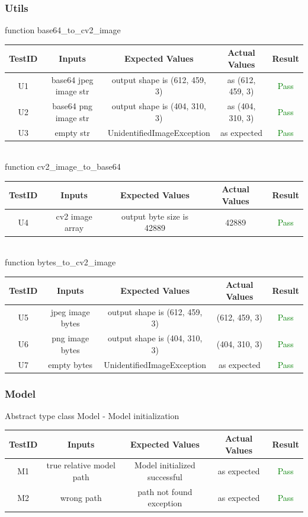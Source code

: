 \documentclass[12pt, oneside, openany, titlepage]{article}
\begin{document}
\subsubsection{Utils}
function base64\_to\_cv2\_image \\
\begin{tabular}{ |c|c|c|c|c| } 
 \hline
 TestID & Inputs & Expected Values & Actual Values & Result \\ 
 \hline
U1 & base64 jpeg image str & output shape is (612, 459, 3) & as (612, 459, 3) & \textcolor{green}{Pass} \\ 
U2 & base64 png image str & output shape is (404, 310, 3) & as (404, 310, 3) & \textcolor{green}{Pass} \\ 
U3 & empty str & UnidentifiedImageException & as expected & \textcolor{green}{Pass} \\ 
 \hline
\end{tabular}
\\
\newline
function cv2\_image\_to\_base64 \\
\begin{tabular}{ |c|c|c|c|c| } 
 \hline
 TestID & Inputs & Expected Values & Actual Values & Result \\ 
 \hline
U4 & cv2 image array & output byte size is 42889 & 42889 & \textcolor{green}{Pass} \\ 
 \hline
\end{tabular}
\\
\newline
function bytes\_to\_cv2\_image \\
\begin{tabular}{ |c|c|c|c|c| } 
 \hline
 TestID & Inputs & Expected Values & Actual Values & Result \\ 
 \hline
U5 & jpeg image bytes & output shape is (612, 459, 3) & (612, 459, 3) & \textcolor{green}{Pass} \\ 
U6 & png image bytes & output shape is (404, 310, 3) & (404, 310, 3) & \textcolor{green}{Pass} \\
U7 & empty bytes & UnidentifiedImageException & as expected & \textcolor{green}{Pass} \\
 \hline
\end{tabular}
\subsubsection{Model}

Abstract type class Model - Model initialization\\
\newline
\begin{tabular}{ |c|c|c|c|c| } 
 \hline
 TestID & Inputs & Expected Values & Actual Values & Result \\ 
 \hline
M1 & true relative model path & Model initialized successful & as expected & \textcolor{green}{Pass} \\ 
M2 & wrong path & path not found exception & as expected & \textcolor{green}{Pass} \\ 
 \hline
\end{tabular}
\end{document}
